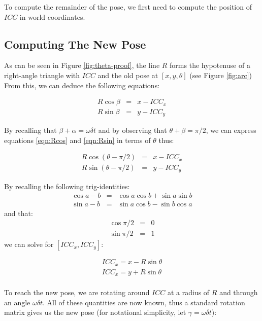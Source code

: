\documentclass[11pt]{article}
\begin{document}
To compute the remainder of the pose, we first need to compute the position of $ICC$ in world coordinates.

\subsection{Computing The New Pose}

As can be seen in Figure \ref{fig:theta-proof}, the line $R$ forms the hypotenuse of a right-angle triangle 
with $ICC$ and the old pose at $[x,y,\theta]$ (see Figure \ref{fig:arc})
From this, we can deduce the following equations:

\begin{eqnarray}
R\cos{\beta} &=& x - ICC_x \label{eqn:Rcos}\\
R\sin{\beta} &=& y - ICC_y \label{eqn:Rsin}
\end{eqnarray}

By recalling that $\beta + \alpha = \omega\delta t$ and by observing that $\theta + \beta = \pi/2$, we can express
equations \ref{eqn:Rcos} and \ref{eqn:Rsin} in terms of $\theta$ thus:

\begin{eqnarray}
R\cos(\theta - \pi/2) &=& x -ICC_x \\ 
R\sin(\theta - \pi/2) &=& y -ICC_y
\end{eqnarray}

By recalling the following trig-identities:
\begin{eqnarray} 
    \cos{a-b} &=& \cos{a}\cos{b} + \sin{a}\sin{b} \nonumber \\
    \sin{a-b} &=& \sin{a}\cos{b} - \sin{b}\cos{a} \nonumber
\end{eqnarray}
and that:
\begin{eqnarray}
    \cos{\pi/2} &=& 0 \nonumber \\
    \sin{\pi/2} &=& 1 \nonumber 
\end{eqnarray}
we can solve for $[ICC_x, ICC_y]$:

\begin{eqnarray}
    ICC_x = x - R\sin{\theta} \label{eqn:icc-x} \\
    ICC_x = y + R\sin{\theta} \label{eqn:icc-y} \\
\end{eqnarray}

To reach the new pose, we are rotating around $ICC$ at a radius of $R$ and through an angle $\omega\delta t$. All of these
quantities are now known, thus a standard rotation matrix gives us the new pose (for notational simplicity, let 
$\gamma = \omega\delta t$):
\end{document}
